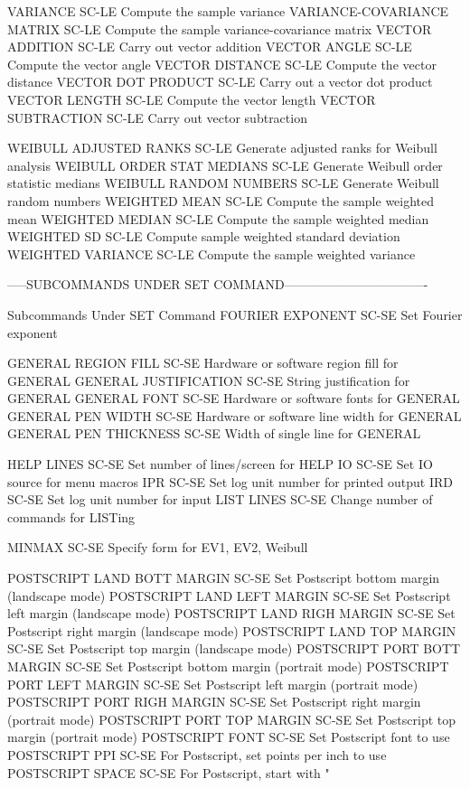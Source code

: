 VARIANCE                    SC-LE Compute the sample variance
VARIANCE-COVARIANCE MATRIX  SC-LE Compute the sample variance-covariance matrix
VECTOR ADDITION             SC-LE Carry out vector addition
VECTOR ANGLE                SC-LE Compute the vector angle
VECTOR DISTANCE             SC-LE Compute the vector distance
VECTOR DOT PRODUCT          SC-LE Carry out a vector dot product
VECTOR LENGTH               SC-LE Compute the vector length
VECTOR SUBTRACTION          SC-LE Carry out vector subtraction

WEIBULL ADJUSTED RANKS      SC-LE Generate adjusted ranks for Weibull analysis
WEIBULL ORDER STAT MEDIANS  SC-LE Generate Weibull order statistic medians
WEIBULL RANDOM NUMBERS      SC-LE Generate Weibull random numbers
WEIGHTED MEAN               SC-LE Compute the sample weighted mean
WEIGHTED MEDIAN             SC-LE Compute the sample weighted median
WEIGHTED SD                 SC-LE Compute sample weighted standard deviation
WEIGHTED VARIANCE           SC-LE Compute the sample weighted variance

-----SUBCOMMANDS UNDER SET COMMAND----------------------------------

Subcommands Under SET Command
FOURIER EXPONENT            SC-SE Set Fourier exponent

GENERAL REGION FILL         SC-SE Hardware or software region fill for GENERAL
GENERAL JUSTIFICATION       SC-SE String justification for GENERAL
GENERAL FONT                SC-SE Hardware or software fonts for GENERAL
GENERAL PEN WIDTH           SC-SE Hardware or software line width for GENERAL
GENERAL PEN THICKNESS       SC-SE Width of single line for GENERAL

HELP LINES                  SC-SE Set number of lines/screen for HELP
IO                          SC-SE Set IO source for menu macros
IPR                         SC-SE Set log unit number for printed output
IRD                         SC-SE Set log unit number for input
LIST LINES                  SC-SE Change number of commands for LISTing

MINMAX                      SC-SE Specify form for EV1, EV2, Weibull

POSTSCRIPT LAND BOTT MARGIN SC-SE Set Postscript bottom margin (landscape mode)
POSTSCRIPT LAND LEFT MARGIN SC-SE Set Postscript left margin (landscape mode)
POSTSCRIPT LAND RIGH MARGIN SC-SE Set Postscript right margin (landscape mode)
POSTSCRIPT LAND TOP  MARGIN SC-SE Set Postscript top margin (landscape mode)
POSTSCRIPT PORT BOTT MARGIN SC-SE Set Postscript bottom margin (portrait mode)
POSTSCRIPT PORT LEFT MARGIN SC-SE Set Postscript left margin (portrait mode)
POSTSCRIPT PORT RIGH MARGIN SC-SE Set Postscript right margin (portrait mode)
POSTSCRIPT PORT TOP  MARGIN SC-SE Set Postscript top margin (portrait mode)
POSTSCRIPT FONT             SC-SE Set Postscript font to use
POSTSCRIPT PPI              SC-SE For Postscript, set points per inch to use
POSTSCRIPT SPACE            SC-SE For Postscript, start with "%

